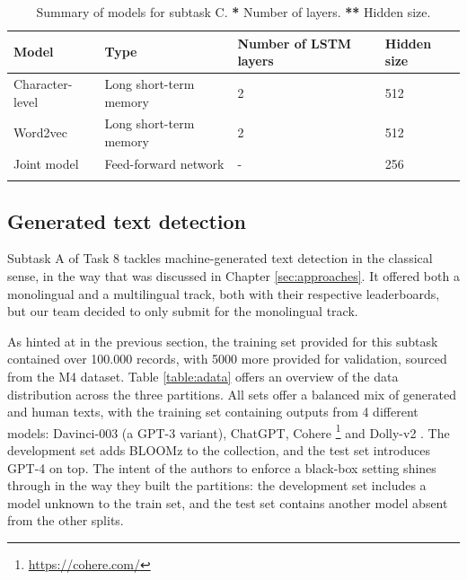 \begin{table}[h]
    \centering
    \begin{tabular}{llll}
        \hline
        \textbf{Model}  & \textbf{Type}          & \textbf{Number of LSTM layers} & \textbf{Hidden size} \\
        \hline
        Character-level & Long short-term memory & 2                              & 512                  \\
        Word2vec        & Long short-term memory & 2                              & 512                  \\
        Joint model     & Feed-forward network   & -                              & 256                  \\
        \hline
        \vspace{0.1cm}
    \end{tabular}
    \caption{Summary of models for subtask C. \textbf{*} Number of layers. \textbf{**} Hidden size.}
    \label{tab:c_models}
\end{table}


\subsection{Generated text detection}
\label{subsec:subtask_a}

Subtask A of Task 8 tackles machine-generated text detection in the classical sense, in the way that was discussed in Chapter \ref{sec:approaches}.
It offered both a monolingual and a multilingual track, both with their respective leaderboards, but our team decided to only submit for the monolingual track.

As hinted at in the previous section, the training set provided for this subtask contained over 100.000 records, with 5000 more provided for validation, sourced from the M4 \citep{wang-etal-2024-m4} dataset.
Table \ref{table:adata} offers an overview of the data distribution across the three partitions.
All sets offer a balanced mix of generated and human texts, with the training set containing outputs from 4 different models: Davinci-003 (a GPT-3 variant), ChatGPT, Cohere \footnote{\url{https://cohere.com/}} and Dolly-v2 \citep{DatabricksBlog2023DollyV2}. The development set adds BLOOMz \citep{muennighoff2023crosslingualgeneralizationmultitaskfinetuning} to the collection, and the test set introduces GPT-4 on top.
The intent of the authors to enforce a black-box setting shines through in the way they built the partitions: the development set includes a model unknown to the train set, and the test set contains another model absent from the other splits.

